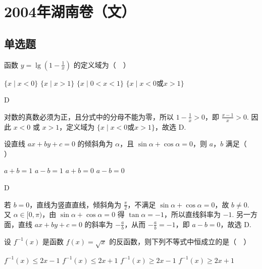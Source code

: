 \chapter{2004年湖南卷（文）}
\section{单选题}
\begin{problem}
函数 \( y = \lg \left(1 - \frac{1}{x}\right) \) 的定义域为（\(\quad\)）

\choices
    {\(\{x\mid x < 0\}\)}
    {\(\{x\mid x > 1\}\)}
    {\(\{x\mid 0 < x < 1\}\)}
    {\(\{x\mid x < 0\text{或} x > 1\}\)}
\end{problem}

\begin{answer}
D
\end{answer}

\begin{solution}
对数的真数必须为正，且分式中的分母不能为零，所以
\(1-\frac{1}{x}>0\)，即 \(\frac{x-1}{x}>0\). 因此 \(x<0\) 或 \(x>1\)，定义域为 \(\{x\mid x<0\text{或}x>1\}\)，故选 D.
\end{solution}

\begin{problem}
设直线 \(ax + by + c = 0\) 的倾斜角为 \(\alpha\)，且 \(\sin \alpha + \cos \alpha = 0\)，则 \(a\)，\(b\) 满足（\(\quad\)）

\choices
    {\(a + b = 1\)}
    {\(a - b = 1\)}
    {\(a + b = 0\)}
    {\(a - b = 0\)}
\end{problem}

\begin{answer}
D
\end{answer}

\begin{solution}
若 \(b=0\)，直线为竖直直线，倾斜角为 \(\frac{\pi}{2}\)，不满足 \(\sin\alpha+\cos\alpha=0\)，故 \(b\ne0\). 又 \(\alpha\in[0,\pi)\)，由 \(\sin\alpha+\cos\alpha=0\) 得 \(\tan\alpha=-1\)，所以直线斜率为 \(-1\). 另一方面，直线 \(ax+by+c=0\) 的斜率为 \(-\frac{a}{b}\)，从而 \(-\frac{a}{b}=-1\)，即 \(a-b=0\)，故选 D.
\end{solution}

\begin{problem}
设 \( f^{-1}(x) \) 是函数 \( f(x) = \sqrt{x} \) 的反函数，则下列不等式中恒成立的是（\(\quad\)）

\choices
    {\(f^{-1}(x)\leqslant 2x - 1\)}
    {\(f^{-1}(x)\leqslant 2x + 1\)}
    {\(f^{-1}(x)\geqslant 2x - 1\)}
    {\(f^{-1}(x)\geqslant 2x + 1\)}
\end{problem}

